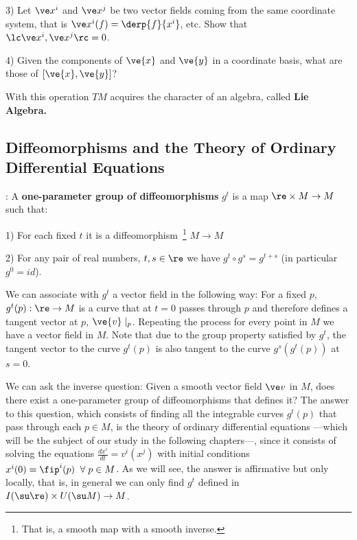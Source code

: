 3) Let $\ve x^i $ and $\ve x^j$ be two vector fields coming from
the same coordinate system, that is $\ve x^i(f) = \derp{f}{x^i}$, etc.
Show that $\lc \ve x^i, \ve x^j \rc = 0$.

4) Given the components of $\ve{ x}$ and $\ve{ y}$ in a coordinate
basis, what are those of $[\ve{ x},\ve{ y}]$? 

With this operation $TM$ acquires the character of an algebra, called
{\bf Lie Algebra.}


\subsection{Diffeomorphisms and the Theory of Ordinary Differential Equations}



: A {\bf one-parameter group of diffeomorphisms} $g^t$ is a map
$\re\times M\to M$ such that:

1) For each fixed $t$ it is a diffeomorphism~\footnote{That is, a smooth map with a smooth inverse.} $M\to M$ 

2) For any pair of real numbers, $t,s\in \re$ we have $g^t\circ g^s=g^{t+s}$
(in particular
$g^0=id$).

\espa
We can associate with $g^t$ a vector field in the
following way: For a fixed $p$, $g^t(p):\re\to M$ is a curve
that at $t=0$ passes through $p$ and therefore defines a tangent vector at
$p$, ${\ve{ v}}\mid_p$. Repeating the process for every point in $M$ we have
a vector field in $M$. Note that due to the group property
satisfied by $g^t$, the tangent vector to the curve $g^t(p)$ is also
tangent to the curve $g^s(g^t(p))$ at $s=0$.

We can ask the inverse question: Given a smooth vector field
$\ve v$
in $M$, does there exist a one-parameter group of diffeomorphisms that defines it? The answer to this question, which consists of finding all
the integrable curves $g^t(p)$ that pass through each $p\in M$, is
the theory of ordinary differential equations
---which will be the subject of our study in the following chapters---,
since it consists of solving the
equations $\frac {dx^i}{dt}=v^i(x^j)$ with initial conditions
$x^i(0)=\fip^i(p) \;\;\forall\;p\in M$. As we will see, the answer is
affirmative but only locally, that is, in general we can only find
$g^t$ defined in $I(\su \re)\times U(\su M)\to M$.


